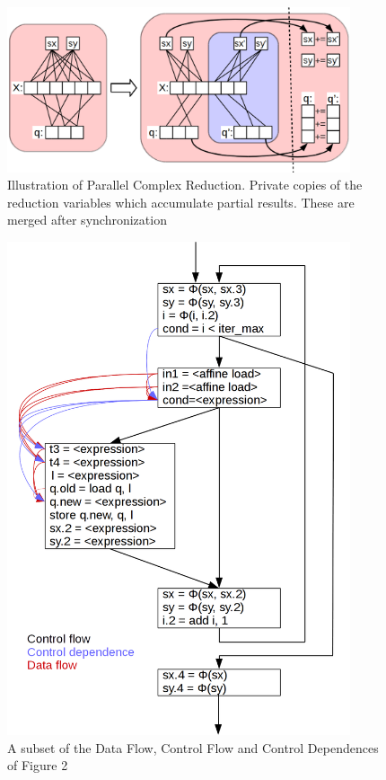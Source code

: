 \begin{figure}[h]
\centering
\includegraphics[width=0.9\textwidth]{figures/nicepicture.png}
\caption{Illustration of Parallel Complex Reduction. Private copies of the reduction variables which accumulate partial results. These are merged after synchronization}
\label{nice-picture}
\end{figure}


\begin{figure}[p]
\centering
 \includegraphics[width=0.9\textwidth]{figures/nicepicture2.png}
 \caption{A subset of the Data Flow, Control Flow and Control Dependences of Figure 2}
 \label{nice-picture2}
 \end{figure}


